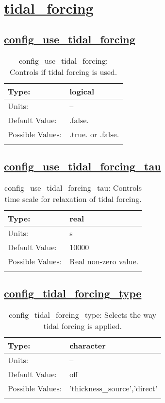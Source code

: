 \section[tidal\_forcing]{\hyperref[sec:nm_tab_tidal_forcing]{tidal\_forcing}}
\label{sec:nm_sec_tidal_forcing}
\subsection[config\_use\_tidal\_forcing]{\hyperref[sec:nm_tab_tidal_forcing]{config\_use\_tidal\_forcing}}
\label{subsec:nm_sec_config_use_tidal_forcing}
\begin{center}
\begin{longtable}{| p{2.0in} || p{4.0in} |}
    \hline
    Type: & logical \\
    \hline
    Units: & -- \\
    \hline
    Default Value: & .false. \\
    \hline
    Possible Values: & .true. or .false. \\
    \hline
    \caption{config\_use\_tidal\_forcing: Controls if tidal forcing is used.}
\end{longtable}
\end{center}
\subsection[config\_use\_tidal\_forcing\_tau]{\hyperref[sec:nm_tab_tidal_forcing]{config\_use\_tidal\_forcing\_tau}}
\label{subsec:nm_sec_config_use_tidal_forcing_tau}
\begin{center}
\begin{longtable}{| p{2.0in} || p{4.0in} |}
    \hline
    Type: & real \\
    \hline
    Units: & \si{s} \\
    \hline
    Default Value: & 10000 \\
    \hline
    Possible Values: & Real non-zero value. \\
    \hline
    \caption{config\_use\_tidal\_forcing\_tau: Controls time scale for relaxation of tidal forcing.}
\end{longtable}
\end{center}
\subsection[config\_tidal\_forcing\_type]{\hyperref[sec:nm_tab_tidal_forcing]{config\_tidal\_forcing\_type}}
\label{subsec:nm_sec_config_tidal_forcing_type}
\begin{center}
\begin{longtable}{| p{2.0in} || p{4.0in} |}
    \hline
    Type: & character \\
    \hline
    Units: & -- \\
    \hline
    Default Value: & off \\
    \hline
    Possible Values: & 'thickness\_source','direct' \\
    \hline
    \caption{config\_tidal\_forcing\_type: Selects the way tidal forcing is applied.}
\end{longtable}
\end{center}
